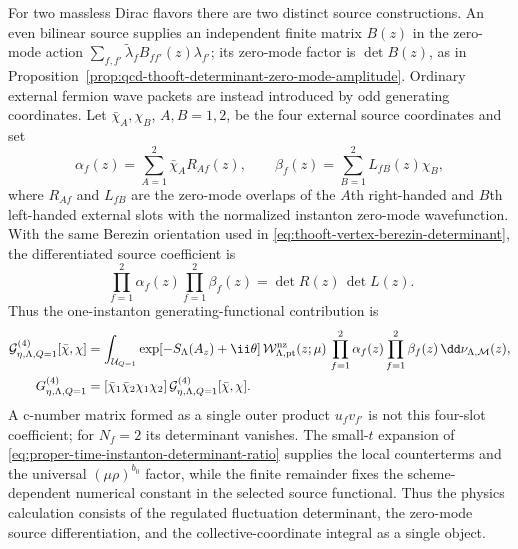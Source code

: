 \begin{proposition}
For two massless Dirac flavors there are two distinct source constructions.
An even bilinear source supplies an independent finite matrix \(B(z)\) in the
zero-mode action \(\sum_{f,f'}\widetilde\lambda_f B_{ff'}(z)\lambda_{f'}\);
its zero-mode factor is \(\det B(z)\), as in
Proposition~\ref{prop:qcd-thooft-determinant-zero-mode-amplitude}.  Ordinary
external fermion wave packets are instead introduced by odd generating
coordinates.  Let \(\bar\chi_A,\chi_B\), \(A,B=1,2\), be the four external
source coordinates and set
\begin{equation}
  \alpha_f(z)=\sum_{A=1}^{2}\bar\chi_A R_{Af}(z),
  \qquad
  \beta_f(z)=\sum_{B=1}^{2}L_{fB}(z)\chi_B,
  \label{eq:zero-mode-linear-source-overlaps}
\end{equation}
where \(R_{Af}\) and \(L_{fB}\) are the zero-mode overlaps of the \(A\)th
right-handed and \(B\)th left-handed external slots with the normalized
instanton zero-mode wavefunction.  With the same Berezin orientation used in
\eqref{eq:thooft-vertex-berezin-determinant}, the differentiated source
coefficient is
\begin{equation}
  [\bar\chi_1\bar\chi_2\chi_1\chi_2]\,
  \prod_{f=1}^{2}\alpha_f(z)\prod_{f=1}^{2}\beta_f(z)
  =
  \det R(z)\,\det L(z).
  \label{eq:zero-mode-differentiated-four-slot-coefficient}
\end{equation}
Thus the one-instanton generating-functional contribution is
\begin{equation}
\begin{aligned}
  \mathcal G_{\eta,\Lambda,Q=1}^{(4)}[\bar\chi,\chi]
  &=
  \int_{\mathcal U_{Q=1}}
  \exp[-S_\Lambda(A_z)+\ii\theta]\,
  \mathcal W_{\Lambda,{\rm pt}}^{\rm nz}(z;\mu)\,
  \prod_{f=1}^{2}\alpha_f(z)\prod_{f=1}^{2}\beta_f(z)\,
  \dd\nu_{\Lambda,\mathcal M}(z),\\
  G^{(4)}_{\eta,\Lambda,Q=1}
  &=
  [\bar\chi_1\bar\chi_2\chi_1\chi_2]\,
  \mathcal G_{\eta,\Lambda,Q=1}^{(4)}[\bar\chi,\chi].
\end{aligned}
  \label{eq:proper-time-four-fermion-instanton-amplitude}
\end{equation}
A c-number matrix formed as a single outer product \(u_fv_{f'}\) is not this
four-slot coefficient; for \(N_f=2\) its determinant vanishes.  The
small-\(t\) expansion of
\eqref{eq:proper-time-instanton-determinant-ratio} supplies the local
counterterms and the universal \((\mu\rho)^{b_0}\) factor, while the finite
remainder fixes the scheme-dependent numerical constant in the selected
source functional.  Thus the physics calculation consists of the regulated
fluctuation determinant, the zero-mode source differentiation, and the
collective-coordinate integral as a single object.
\end{proposition}

